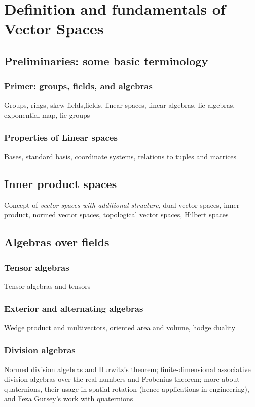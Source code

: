 \chapter{Definition and fundamentals of Vector Spaces}
\section{Preliminaries: some basic terminology}
\subsection{Primer: groups, fields, and algebras}
Groups, rings, skew fields,fields, linear spaces, linear algebras, lie algebras, exponential map, lie groups
\subsection{Properties of Linear spaces}
Bases, standard basis, coordinate systems, relations to tuples and matrices
\section{Inner product spaces}
Concept of \emph{vector spaces with additional structure}, dual vector spaces, inner product, normed vector spaces, topological vector spaces, Hilbert spaces
\section{Algebras over fields}
\subsection{Tensor algebras}
Tensor algebras and tensors
\subsection{Exterior and alternating algebras}
Wedge product and multivectors, oriented area and volume, hodge duality

\subsection{Division algebras}
Normed division algebras and Hurwitz's theorem; finite-dimensional associative division algebras over the real numbers and Frobenius theorem; more about quaternions, their usage in spatial rotation (hence applications in engineering), and Feza Gursey's work with quaternions


